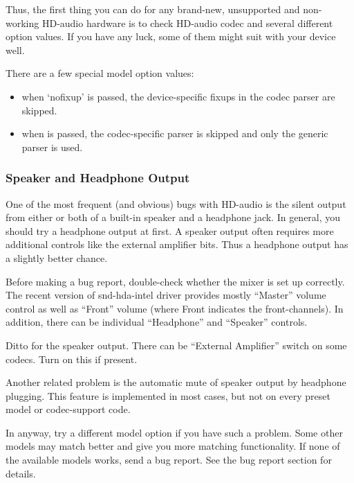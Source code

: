 \documentclass[a4paper,8pt,english]{sphinxmanual}
\begin{document}
Thus, the first thing you can do for any brand-new, unsupported and
non-working HD-audio hardware is to check HD-audio codec and several
different  option values.  If you have any luck, some of them
might suit with your device well.

There are a few special model option values:
\begin{itemize}
\item {} 
when `nofixup' is passed, the device-specific fixups in the codec
parser are skipped.

\item {} 
when  is passed, the codec-specific parser is skipped and
only the generic parser is used.

\end{itemize}


\subsubsection{Speaker and Headphone Output}
\label{sound/hd-audio/notes:speaker-and-headphone-output}
One of the most frequent (and obvious) bugs with HD-audio is the
silent output from either or both of a built-in speaker and a
headphone jack.  In general, you should try a headphone output at
first.  A speaker output often requires more additional controls like
the external amplifier bits.  Thus a headphone output has a slightly
better chance.

Before making a bug report, double-check whether the mixer is set up
correctly.  The recent version of snd-hda-intel driver provides mostly
``Master'' volume control as well as ``Front'' volume (where Front
indicates the front-channels).  In addition, there can be individual
``Headphone'' and ``Speaker'' controls.

Ditto for the speaker output.  There can be ``External Amplifier''
switch on some codecs.  Turn on this if present.

Another related problem is the automatic mute of speaker output by
headphone plugging.  This feature is implemented in most cases, but
not on every preset model or codec-support code.

In anyway, try a different model option if you have such a problem.
Some other models may match better and give you more matching
functionality.  If none of the available models works, send a bug
report.  See the bug report section for details.
\end{document}
